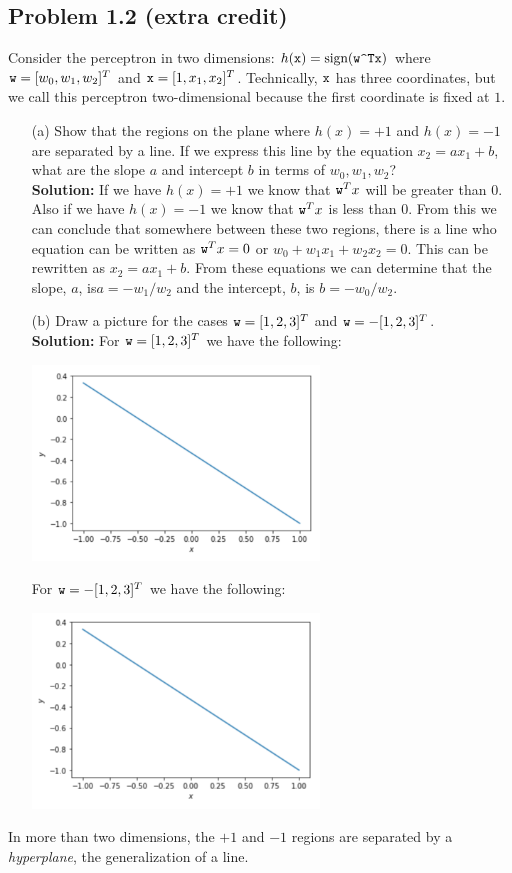 \documentclass[a4paper]{article}
\begin{document}
\subsection{Problem 1.2 (extra credit)} Consider the perceptron in two dimensions: $h(\verb|x|) = \text{sign}
(\verb|w^Tx|)$ where $\verb|w| = [w_0, w_1, w_2]^{T}$ and $\verb|x| = [1, x_1, x_2]^T$.  Technically, 
$\verb|x|$ has three coordinates, but we call this perceptron two-dimensional because the first 
coordinate is fixed at $1$.
\begin{itemize}
    \item[(a)] Show that the regions on the plane where $h(x) = +1$ and $h(x) = -1$ are separated 
    by a line.  If we express this line by the equation $x_2 = ax_1 + b$, what are the slope $a$ and 
    intercept $b$ in terms of $w_0, w_1, w_2$?\\
    \textbf{Solution:} If we have $h(x) = +1$ we know that $\verb|w|^T x$ will be greater than $0$.  
    Also if we have $h(x) = -1$ we know that $\verb|w|^T x$ is less than $0$.  From this we can conclude 
    that somewhere between these two regions, there is a line who equation can be written as 
    $\verb|w|^T x = 0$ or $w_0 + w_1x_1 + w_2x_2 = 0$.  This can be rewritten as $x_2 = ax_1 + b$.  From these equations we can determine that the slope, $a$, is$a = -w_1 / w_2$ and the intercept, $b$, is $b = -w_0 / w_2$.
    \item[(b)] Draw a picture for the cases $\verb|w| = [1, 2, 3]^T$ and $\verb|w| = -[1, 2, 3]^T$.\\
    \textbf{Solution:} For $\verb|w| = [1, 2, 3]^T$ we have the following:
    \begin{center}
        \includegraphics[width=0.6\textwidth]{1-2-b1.jpg}
    \end{center}
    For $\verb|w| = -[1, 2, 3]^T$ we have the following:
    \begin{center}
        \includegraphics[width=0.6\textwidth]{1-2-b2.jpg}
    \end{center}
\end{itemize}
In more than two dimensions, the $+1$ and $-1$ regions are separated by a \textit{hyperplane}, the 
generalization of a line.
\end{document}
